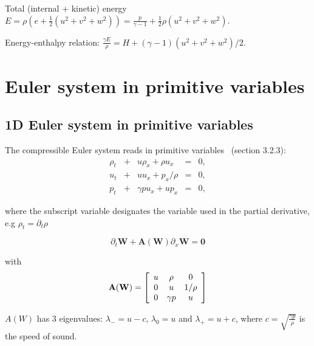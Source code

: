 \documentclass{article}
\begin{document}
Total (internal + kinetic) energy $E = \rho \left( e + \frac{1}{2} (u^2+v^2+w^2) \right) = \frac{p}{\gamma-1} + \frac{1}{2} \rho (u^2+v^2+w^2)$.

Energy-enthalpy relation: $\frac{\gamma E}{\rho}=H+(\gamma-1)(u^2+v^2+w^2)/2$.

\section{Euler system in primitive variables}

\subsection*{1D Euler system in primitive variables}
The compressible Euler system reads in primitive variables~\cite{toro} (section 3.2.3):\\

\begin{equation}
  \begin{array}{ccccc}
    \rho_t & + & u\rho_x + \rho u_x   & = & 0,\\
    u_t    & + & u u_x   + p_x/\rho   & = & 0,\\
    p_t    & + & \gamma p u_x + u p_x & = & 0,
  \end{array}
\end{equation}

where the subscript variable designates the variable used in the partial derivative, e.g $\rho_t = \partial_t \rho$

\begin{equation}
  \partial_t \mathbf{W} + \mathbf{A(W)} \partial_x \mathbf{W} = \mathbf{0}
\end{equation}

with
\begin{equation}
  \mathbf{A(W)} = \left[
    \begin{array}{c c c c}
      u & \rho     & 0 \\
      0 & u        & 1/\rho\\
      0 & \gamma p & u \\
    \end{array}
  \right]
\end{equation}

$A(W)$ has 3 eigenvalues: $\lambda_{-}=u-c$, $\lambda_{0}=u$ and $\lambda_{+}=u+c$, where $c=\sqrt{\frac{\gamma p}{\rho}}$ is the speed of sound. 
\end{document}
